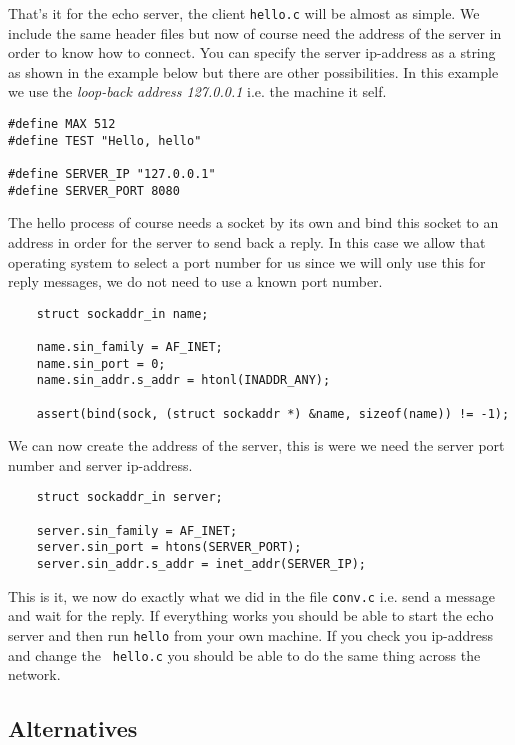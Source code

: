 \documentclass[a4paper,11pt]{article}
\begin{document}
That's it for the echo server, the client {\tt hello.c} will be almost
as simple. We include the same header files but now of course need the
address of the server in order to know how to connect. You can specify
the server ip-address as a string as shown in the example below but
there are other possibilities. In this example we use the {\em
  loop-back address 127.0.0.1} i.e. the machine it self.


\begin{lstlisting}
#define MAX 512
#define TEST "Hello, hello"

#define SERVER_IP "127.0.0.1"
#define SERVER_PORT 8080
\end{lstlisting}

The hello process of course needs a socket by its own and bind this
socket to an address in order for the server to send back a reply. In
this case we allow that operating system to select a port number for us
since we will only use this for reply messages, we do not need to
use a known port number.

\begin{lstlisting}
    struct sockaddr_in name;

    name.sin_family = AF_INET;
    name.sin_port = 0;
    name.sin_addr.s_addr = htonl(INADDR_ANY);

    assert(bind(sock, (struct sockaddr *) &name, sizeof(name)) != -1);    
\end{lstlisting}

We can now create the address of the server, this is were we need the
server port number and server ip-address.

\begin{lstlisting}
    struct sockaddr_in server;

    server.sin_family = AF_INET;
    server.sin_port = htons(SERVER_PORT);
    server.sin_addr.s_addr = inet_addr(SERVER_IP);  
\end{lstlisting}

This is it, we now do exactly what we did in the file {\tt conv.c}
i.e. send a message and wait for the reply. If everything works you
should be able to start the echo server and then run {\tt hello} from
your own machine. If you check you ip-address and change the {\tt
  hello.c} you should be able to do the same thing across the network. 


\subsection{Alternatives}
\end{document}
